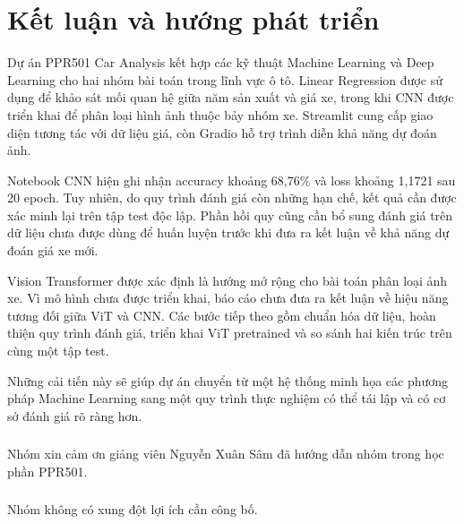 \documentclass[runningheads]{llncs}
\begin{document}
\section{Kết luận và hướng phát triển}

Dự án PPR501 Car Analysis kết hợp các kỹ thuật Machine
Learning và Deep Learning cho hai nhóm bài toán trong
lĩnh vực ô tô. Linear Regression được sử dụng để khảo
sát mối quan hệ giữa năm sản xuất và giá xe, trong khi
CNN được triển khai để phân loại hình ảnh thuộc bảy
nhóm xe. Streamlit cung cấp giao diện tương tác với
dữ liệu giá, còn Gradio hỗ trợ trình diễn khả năng
dự đoán ảnh.

Notebook CNN hiện ghi nhận accuracy khoảng 68,76\%
và loss khoảng 1,1721 sau 20 epoch. Tuy nhiên, do
quy trình đánh giá còn những hạn chế, kết quả cần
được xác minh lại trên tập test độc lập. Phần hồi
quy cũng cần bổ sung đánh giá trên dữ liệu chưa được
dùng để huấn luyện trước khi đưa ra kết luận về khả
năng dự đoán giá xe mới.

Vision Transformer được xác định là hướng mở rộng
cho bài toán phân loại ảnh xe. Vì mô hình chưa được
triển khai, báo cáo chưa đưa ra kết luận về hiệu năng
tương đối giữa ViT và CNN. Các bước tiếp theo gồm
chuẩn hóa dữ liệu, hoàn thiện quy trình đánh giá,
triển khai ViT pretrained và so sánh hai kiến trúc
trên cùng một tập test.

Những cải tiến này sẽ giúp dự án chuyển từ một hệ
thống minh họa các phương pháp Machine Learning
sang một quy trình thực nghiệm có thể tái lập và
có cơ sở đánh giá rõ ràng hơn.

\begin{credits}
    \subsubsection{\ackname}
    Nhóm xin cảm ơn giảng viên Nguyễn Xuân Sâm đã hướng
    dẫn nhóm trong học phần PPR501.

    \subsubsection{\discintname}
    Nhóm không có xung đột lợi ích cần công bố.
\end{credits}
\end{document}

